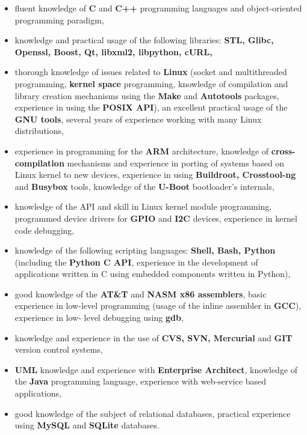 \documentclass[10pt]{article}
\begin{document}
\begin{itemize}
	\item fluent knowledge of \textbf{C} and \textbf{C++} programming languages and object-oriented
	programming paradigm,
	\item knowledge and practical usage of the following libraries: \textbf{STL, Glibc, Openssl,
	Boost, Qt, libxml2, libpython, cURL,}
	\item thorough knowledge of issues related to \textbf{Linux} (socket and multithreaded
	programming, \textbf{kernel space} programming, knowledge of compilation and library
	creation mechanisms using the \textbf{Make} and \textbf{Autotools} packages, experience in
	using the \textbf{POSIX API}), an excellent practical usage of the \textbf{GNU tools}, several
	years of experience working with many Linux distributions,
	\item experience in programming for the \textbf{ARM} architecture, knowledge of \textbf{cross-
	compilation} mechanisms and experience in porting of systems based on Linux
	kernel to new devices, experience in using \textbf{Buildroot, Crosstool-ng} and \textbf{Busybox}
	tools, knowledge of the \textbf{U-Boot} bootloader's internals,
	\item knowledge of the API and skill in Linux kernel module programming, programmed
	device drivers for \textbf{GPIO} and \textbf{I2C} devices, experience in kernel code debugging,
	\item knowledge of the following scripting languages: \textbf{Shell, Bash, Python} (including
	the \textbf{Python C API}, experience in the development of applications written in C
	using embedded components written in Python),
	\item good knowledge of the \textbf{AT\&T} and \textbf{NASM x86 assemblers}, basic experience in
	low-level programming (usage of the inline assembler in \textbf{GCC}), experience in low-
	level debugging using \textbf{gdb},
	\item knowledge and experience in the use of \textbf{CVS, SVN, Mercurial} and \textbf{GIT} version
	control systems,
	\item \textbf{UML} knowledge and experience with \textbf{Enterprise Architect},
	knowledge of the \textbf{Java} programming language, experience with web-service based
	applications,
	\item good knowledge of the subject of relational databases, practical experience using
	\textbf{MySQL} and \textbf{SQLite} databases.
\end{itemize}
\end{document}

